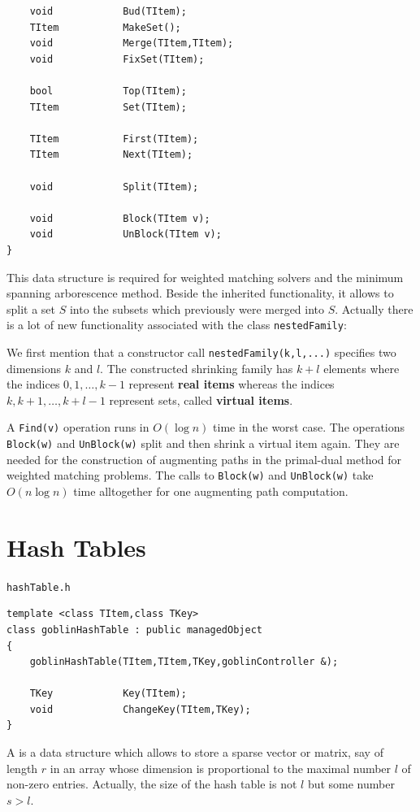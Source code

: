 \documentclass[a4paper,11pt,twoside]{book}
\begin{document}
\begin{multicols}{2}
\begin{mymethods}
\begin{verbatim}
    void            Bud(TItem);
    TItem           MakeSet();
    void            Merge(TItem,TItem);
    void            FixSet(TItem);

    bool            Top(TItem);
    TItem           Set(TItem);

    TItem           First(TItem);
    TItem           Next(TItem);

    void            Split(TItem);

    void            Block(TItem v);
    void            UnBlock(TItem v);
}
\end{verbatim}
\end{mymethods}
This data structure is required for weighted matching solvers and the minimum
spanning arborescence method. Beside the inherited functionality, it allows to
split a set $S$ into the subsets which previously were merged into $S$.
Actually there is a lot of new functionality associated with the class
\verb/nestedFamily/:

We first mention that a constructor call \verb/nestedFamily(k,l,...)/
specifies two dimensions $k$ and $l$. The constructed shrinking family has
$k+l$ elements where the indices $0,1,\dots,k-1$ represent {\bf real items}
 whereas the indices $k,k+1,\dots,k+l-1$
represent sets, called {\bf virtual items}.

A \verb/Find(v)/ operation runs in $O(\log n)$ time in the worst case. The
operations \verb/Block(w)/ and \verb/UnBlock(w)/ split and then shrink a virtual
item again. They are needed for the construction of augmenting paths in the
primal-dual method for weighted matching problems. The calls to \verb/Block(w)/
and \verb/UnBlock(w)/ take $O(n\log{n})$ time alltogether for one augmenting path
computation.



\section{Hash Tables}
\myinclude\verb/hashTable.h/
\begin{mymethods}
\begin{verbatim}
template <class TItem,class TKey>
class goblinHashTable : public managedObject
{
    goblinHashTable(TItem,TItem,TKey,goblinController &);

    TKey            Key(TItem);
    void            ChangeKey(TItem,TKey);
}
\end{verbatim}
\end{mymethods}
A  is a data structure which allows to store a sparse vector or
matrix, say of length $r$ in an array whose dimension is proportional to the
maximal number $l$ of non-zero entries. Actually, the size of the hash table
is not $l$ but some number $s>l$.


\end{multicols}
\end{document}
